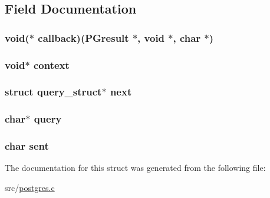 \subsection{Field Documentation}
\hypertarget{structquery__struct_a9e358202526ef6f362060add447a5822}{
\subsubsection[{callback}]{\setlength{\rightskip}{0pt plus 5cm}void($\ast$ callback)(P\-Gresult $\ast$, void $\ast$, char $\ast$)}}\label{structquery__struct_a9e358202526ef6f362060add447a5822}
\hypertarget{structquery__struct_ae376f130b17d169ee51be68077a89ed0}{
\subsubsection[{context}]{\setlength{\rightskip}{0pt plus 5cm}void$\ast$ context}}\label{structquery__struct_ae376f130b17d169ee51be68077a89ed0}
\hypertarget{structquery__struct_addbda803c3d54ffae5a8c673ea3e701e}{
\subsubsection[{next}]{\setlength{\rightskip}{0pt plus 5cm}struct {\bf query\-\_\-struct}$\ast$ next}}\label{structquery__struct_addbda803c3d54ffae5a8c673ea3e701e}
\hypertarget{structquery__struct_af26982218484ec3fdcb8f7d92e864a9b}{
\subsubsection[{query}]{\setlength{\rightskip}{0pt plus 5cm}char$\ast$ query}}\label{structquery__struct_af26982218484ec3fdcb8f7d92e864a9b}
\hypertarget{structquery__struct_a59a9dc1eb9f9942b0a09df5acb7a31ff}{
\subsubsection[{sent}]{\setlength{\rightskip}{0pt plus 5cm}char sent}}\label{structquery__struct_a59a9dc1eb9f9942b0a09df5acb7a31ff}


The documentation for this struct was generated from the following file\-:\begin{DoxyCompactItemize}
\item 
src/\hyperlink{postgres_8c}{postgres.\-c}\end{DoxyCompactItemize}
